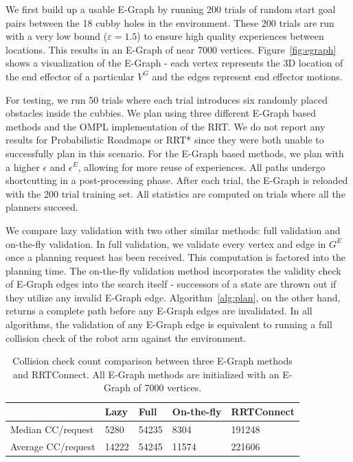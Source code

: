 \documentclass[letterpaper, 10 pt, conference]{ieeeconf}  %
\newcommand{\tablab}[1]{\label{tab:#1}}
\newcommand{\algref}[1]{Algorithm~\ref{alg:#1}}
\newcommand{\figref}[1]{Figure~\ref{fig:#1}}
\begin{document}
We first build up a usable E-Graph by running 200 trials of random start goal
pairs between the 18 cubby holes in the environment. These 200 trials are run
with a very low bound ($\varepsilon=1.5$) to ensure high quality experiences
between locations. This results in an E-Graph of near 7000 vertices.
\figref{egraph} shows a visualization of the E-Graph - each vertex represents
the 3D location of the end effector of a particular $V^G$ and the edges
represent end effector motions.

For testing, we run 50 trials where each trial introduces six randomly placed
obstacles inside the cubbies. We plan using three different E-Graph based
methods and the OMPL \cite{ompl} implementation of the RRT. We do not report
any results for Probabilistic Roadmaps or RRT* since they were
both unable to successfully plan in this scenario. For the E-Graph based
methods, we plan with a higher $\epsilon$ and $\epsilon^E$, allowing for more
reuse of experiences. All paths undergo shortcutting in a post-processing phase.
After each trial, the E-Graph is reloaded with the 200 trial training set. All
statistics are computed on trials where all the planners succeed.


We compare lazy validation with two other similar methods: full validation and
on-the-fly validation. In full validation, we validate every vertex and edge in
$G^E$ once a planning request has been received. This computation is factored
into the planning time.  The on-the-fly validation method incorporates the
validity check of E-Graph edges into the search itself - successors of a state
are thrown out if they utilize any invalid E-Graph edge. \algref{plan}, on the
other hand, returns a complete path before any E-Graph edges are invalidated.
In all algorithms, the validation of any E-Graph edge is equivalent to running a
full collision check of the robot arm against the environment.

\begin{table}[h]
    \begin{center}
        \begin{tabular}{| l | l | l | l | l | }
            \hline
            & Lazy & Full & On-the-fly & RRTConnect \\ \hline
            Median CC/request & 5280 & 54235 & 8304 & 191248 \\ \hline
            Average CC/request & 14222 & 54245 & 11574 & 221606\\ \hline
        \end{tabular}
    \end{center}
    \caption{Collision check count comparison between three E-Graph methods and
    RRTConnect. All E-Graph methods are initialized with an E-Graph of 7000
vertices.}
    \tablab{cccount}
\end{table}
\end{document}
